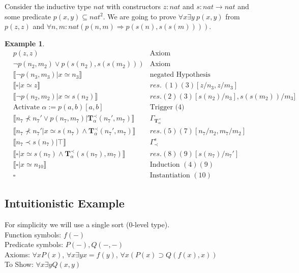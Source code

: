 \documentclass[onehalfspacing]{article}
\newtheorem{example}[theorem]{Example}
\newcommand{\llb}{\llbracket}
\newcommand{\rrb}{\rrbracket}
\begin{document}
Consider the inductive type $nat$ with constructors $z : nat$ and $s: nat \to nat$ and some predicate $p(x, y)\subseteq nat^2$. We are going to prove $\forall x\exists y\: p(x,y)$ from $p(z, z)$ and $\forall n,m:nat(p(n, m)\Rightarrow p(s(n), s(s(m))))$.

\begin{example}\hfill
	\begin{align}
		& p(z, z) & \text{Axiom}\\
		& \neg p(n_2, m_2)\vee p(s(n_2), s(s(m_2)))& \text{Axiom}\\
		& \llb \neg p(n_3, m_3) | x\simeq n_3\rrb & \text{negated Hypothesis}\\
		& \llb \square | x\simeq z\rrb & res.\:(1) (3) [z/n_3, z/m_3]\\
		& \llb \neg p(n_2, m_2) | x\simeq s(n_2)\rrb &res. (2) (3) [s(n_2)/n_3], s(s(m_2))/m_3]\\
		& \text{Activate $\alpha := p(a, b)[a, b]$}&\text{Trigger  (4)}\\
		& \llb n_7\not\prec n_7'\vee p(n_7, m_7) | \mathbf{T}_\alpha^\prec(n_7', m_7)\rrb& \Gamma_{\mathbf{T}_\alpha^\prec}\\
		& \llb n_7\not\prec n_7'| x\simeq s(n_7)\wedge \mathbf{T}_\alpha^\prec(n_7', m_7)\rrb & res. (5) (7) [n_7/n_2, m_7/ m_2] \\
		& \llb n_7\prec s(n_7)|\top\rrb &\Gamma_\prec^s\\
		& \llb \square | x\simeq s(n_7)\wedge\mathbf{T}_\alpha^\prec(s(n_7), m_7)\rrb&res. (8)(9)[s(n_7)/n_7']\\
		& \llb \square | x\simeq n_{10}\rrb &\text{Induction }(4)(9)\\
		& \square &\text{Instantiation }(10)
	\end{align}
\end{example}
\pagebreak
\subsection{Intuitionistic Example}

For simplicity we will use a single sort (0-level type).\\
Function symbols: $f(-)$\\
Predicate symbols: $P(-), Q(-, -)$\\
Axioms: $\forall x P(x)$, $\forall x\exists y x=f(y)$, $\forall x(P(x)\supset Q(f(x), x))$\\
To Show: $\forall x \exists y Q(x, y)$\\
\end{document}

